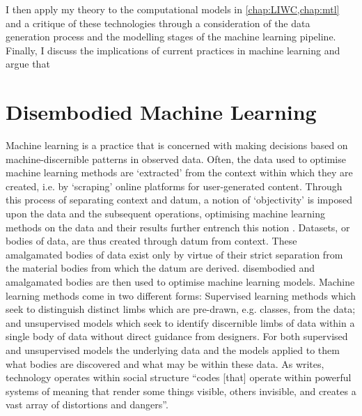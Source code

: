 {I then  apply my theory  to the computational models in \cref{chap:LIWC,chap:mtl} and  a critique of these technologies through a consideration of the data generation process and the modelling stages of the machine learning pipeline.
Finally, I discuss the implications of current practices in machine learning and argue that 

\section{Disembodied Machine Learning}
Machine learning is a practice that is concerned with making decisions based on machine-discernible patterns in observed data.
Often, the data used to optimise machine learning methods are `extracted' from the context within which they are created, i.e. by `scraping' online platforms for user-generated content.
Through this process of separating context and datum, a notion of `objectivity' is imposed upon the data and the subsequent operations,  optimising machine learning methods on the data and their results further entrench this notion .
Datasets, or bodies of data, are thus created through  datum from context.
These amalgamated bodies of data exist only by virtue of their strict separation from the material bodies from which the datum are derived.
 disembodied and amalgamated bodies are then used to optimise machine learning models.
Machine learning methods come in two different forms: Supervised learning methods which seek to distinguish distinct limbs which are pre-drawn, e.g. classes, from the data; and unsupervised models which seek to identify discernible limbs of data within a single body of data without direct guidance from designers.
For both supervised and unsupervised models the underlying data and the models applied to them  what bodies are discovered and what may be  within these data.
As \citet{Benjamin:2019} writes, technology operates within social structure ``codes [that] operate within powerful systems of meaning that render some things visible, others invisible, and creates a vast array of distortions and dangers''.\vspace{5mm}

}
